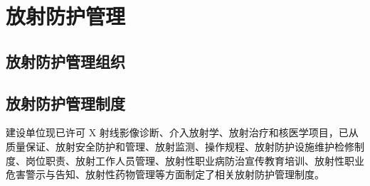 \chapter{放射防护管理}

\section{放射防护管理组织}



\section{放射防护管理制度}

建设单位现已许可 X 射线影像诊断、介入放射学、放射治疗和核医学项目，已从质量保证、放射安全防护和管理、放射监测、操作规程、放射防护设施维护检修制度、岗位职责、放射工作人员管理、放射性职业病防治宣传教育培训、放射性职业危害警示与告知、放射性药物管理等方面制定了相关放射防护管理制度。

